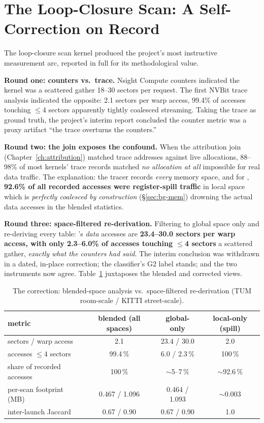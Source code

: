 \section{The Loop-Closure Scan: A Self-Correction on Record}
\label{sec:loc-correction}

The loop-closure scan kernel \stTrack{} produced the project's most instructive measurement arc, reported in full for its methodological value.

\textbf{Round one: counters vs.\ trace.} Nsight Compute counters indicated the kernel was a scattered gather 18--30 sectors per request. The first NVBit trace analysis indicated the opposite: 2.1 sectors per warp access, 99.4\% of accesses touching $\leq$4 sectors apparently tightly coalesced streaming. Taking the trace as ground truth, the project's interim report concluded the counter metric was a proxy artifact “the trace overturns the counters.”

\textbf{Round two: the join exposes the confound.} When the attribution join (Chapter~\ref{ch:attribution}) matched trace addresses against live allocations, 88--98\% of most kernels' trace records matched \emph{no allocation at all} impossible for real data traffic. The explanation: the tracer records \emph{every} memory space, and for \stTrack{}, \textbf{92.6\% of all recorded accesses were register-spill traffic} in local space which is \emph{perfectly coalesced by construction} (\S\ref{sec:bg-mem}) drowning the actual data accesses in the blended statistics.

\textbf{Round three: space-filtered re-derivation.} Filtering to global space only and re-deriving every table: \stTrack{}'s \emph{data} accesses are \textbf{23.4--30.0 sectors per warp access, with only 2.3--6.0\% of accesses touching $\leq$4 sectors} a scattered gather, \emph{exactly what the counters had said}. The interim conclusion was withdrawn in a dated, in-place correction; the classifier's G2 label stands; and the two instruments now agree. Table~\ref{tab:sttrack} juxtaposes the blended and corrected views.

\begin{table}[t]
\centering
\caption{The \stTrack{} correction: blended-space analysis vs.\ space-filtered re-derivation (TUM room-scale / KITTI street-scale).}
\label{tab:sttrack}
\begin{tabular}{@{}lccc@{}}
\toprule
metric & blended (all spaces) & global-only & local-only (spill) \\
\midrule
sectors / warp access & 2.1 & 23.4 / 30.0 & 2.0 \\
accesses $\leq$4 sectors & 99.4\,\% & 6.0 / 2.3\,\% & 100\,\% \\
share of recorded accesses & 100\,\% & $\sim$5--7\,\% & $\sim$92.6\,\% \\
per-scan footprint (MB) & 0.467 / 1.096 & 0.464 / 1.093 & $\sim$0.003 \\
inter-launch Jaccard & 0.67 / 0.90 & 0.67 / 0.90 & 1.0 \\
\bottomrule
\end{tabular}
\end{table}

